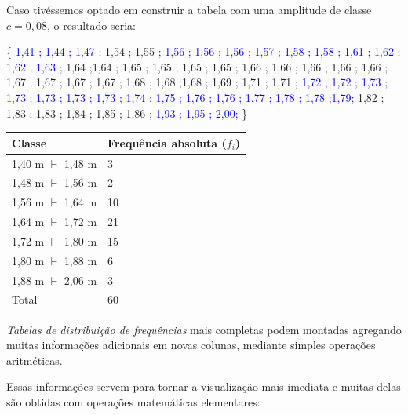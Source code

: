 \documentclass[
]{book}
\begin{document}
\hfill\break

\hfill\break

Caso tivéssemos optado em construir a tabela com uma amplitude de classe \(c=0,08\), o resultado seria:

\hfill\break

\{
\textcolor{blue}{1,41 ; 1,44 ; 1,47 ;}
1,54 ; 1,55 ;
\textcolor{blue}{1,56 ; 1,56 ; 1,56 ; 1,57 ; 1,58 ; 1,58 ; 1,61 ; 1,62 ; 1,62 ; 1,63 ;}
1,64 ;1,64 ; 1,65 ; 1,65 ; 1,65 ; 1,65 ; 1,66 ; 1,66 ; 1,66 ; 1,66 ; 1,66 ; 1,67 ; 1,67 ; 1,67 ; 1,67 ; 1,68 ; 1,68 ;1,68 ; 1,69 ; 1,71 ; 1,71 ;
\textcolor{blue}{1,72 ; 1,72 ; 1,73 ; 1,73 ; 1,73 ; 1,73 ; 1,73 ; 1,74 ; 1,75 ; 1,76 ; 1,76 ; 1,77 ;  1,78 ; 1,78 ;1,79;} 1,82 ; 1,83 ; 1,83 ; 1,84 ; 1,85 ; 1,86 ;
\textcolor{blue}{1,93 ; 1,95 ; 2,00;} \}

\hfill\break

\begin{longtable}[]{@{}ll@{}}
\toprule()
Classe & Frequência absoluta (\(f_{i}\)) \\
\midrule()
\endhead
1,40 m \(\vdash\) 1,48 m & 3 \\
1,48 m \(\vdash\) 1,56 m & 2 \\
1,56 m \(\vdash\) 1,64 m & 10 \\
1,64 m \(\vdash\) 1,72 m & 21 \\
1,72 m \(\vdash\) 1,80 m & 15 \\
1,80 m \(\vdash\) 1,88 m & 6 \\
1,88 m \(\vdash\) 2,06 m & 3 \\
Total & 60 \\
\bottomrule()
\end{longtable}

\hfill\break

\emph{Tabelas de distribuição de frequências} mais completas podem montadas agregando muitas informações adicionais em novas colunas, mediante simples operações aritméticas.

\hfill\break

Essas informações servem para tornar a visualização mais imediata e muitas delas são obtidas com operações matemáticas elementares:

\hfill\break
\end{document}
